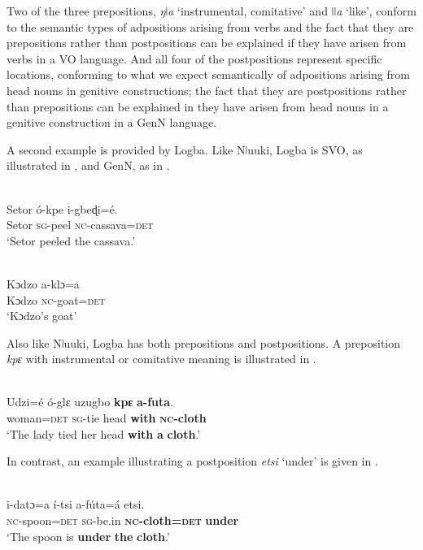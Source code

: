 \documentclass[output=paper]{langsci/langscibook}
\begin{document}
Two of the three prepositions, \textit{ŋǀa} ‘instrumental, comitative’ and \textit{ǀǀa} ‘like’, conform to the semantic types of adpositions arising from verbs and the fact that they are prepositions rather than postpositions can be explained if they have arisen from verbs in a VO language. And all four of the postpositions represent specific locations, conforming to what we expect semantically of adpositions arising from head nouns in genitive constructions; the fact that they are postpositions rather than prepositions can be explained in they have arisen from head nouns in a genitive construction in a GenN language.

A second example is provided by Logba. Like Nǀuuki, Logba is SVO, as illustrated in , and GenN, as in .

\ea\label{ex:dryer:}
\\
\gll Setor  ó-kpe  i-gbeɖi=é.\\
       Setor  \textsc{sg}{}-peel  \textsc{nc}{}-cassava=\textsc{det}\\
\glt   ‘Setor peeled the cassava.’ 
\z

\ea\label{ex:dryer:}
\\
\gll Kɔdzo    a-klɔ=a\\
       Kɔdzo    \textsc{nc}{}-goat=\textsc{det}\\
\glt   ‘Kɔdzo’s goat’ 
\z

Also like Nǀuuki, Logba has both prepositions and postpositions. A preposition \textit{kpɛ} with instrumental or comitative meaning is illustrated in .

\ea\label{ex:dryer:}
\\
\gll Udzi=é  ó-glɛ  uzugbo  \textbf{kpɛ}  \textbf{a-futa}.\\
       woman=\textsc{det}  \textsc{sg}{}-tie  head  \textbf{with}  \textbf{\textsc{nc}}\textbf{{}-cloth}  \\
\glt ‘The lady tied her head \textbf{with} \textbf{a} \textbf{cloth}.’  
\z

In contrast, an example illustrating a postposition \textit{etsi} ‘under’ is given in .

\ea\label{ex:dryer:}
\\
\gll i-datɔ=a  í-tsi  a-fúta=á  etsi.\\
       \textsc{nc}{}-spoon=\textsc{det}  \textsc{sg}{}-be.in  \textbf{\textsc{nc}}\textbf{{}-cloth=}\textbf{\textsc{det}}  \textbf{under}\\
\glt   ‘The spoon is \textbf{under} \textbf{the} \textbf{cloth}.’ 
\z
\end{document}
